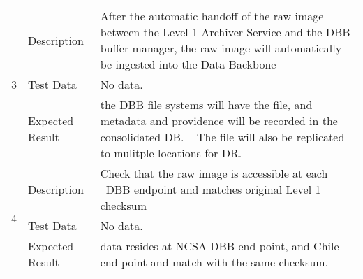 \begin{longtable}[]{p{1.3cm}p{2cm}p{13cm}}
            \multirow{3}{*}{ 3 } & Description &
            \begin{minipage}[t]{13cm}{\footnotesize
            After the automatic handoff of the raw image between the Level 1
Archiver Service and the DBB buffer manager, the raw image will
automatically be ingested into the Data Backbone

            \vspace{\dp0}
            } \end{minipage} \\ \cline{2-3}
            & Test Data &
            \begin{minipage}[t]{13cm}{\footnotesize
                No data.
                \vspace{\dp0}
            } \end{minipage} \\ \cline{2-3}
            & Expected Result &
                \begin{minipage}[t]{13cm}{\footnotesize
                the DBB file systems will have the file, and metadata and providence
will be recorded in the consolidated DB. ~ The file will also be
replicated to mulitple locations for DR.~~

                \vspace{\dp0}
                } \end{minipage}
        \\ \midrule

            \multirow{3}{*}{ 4 } & Description &
            \begin{minipage}[t]{13cm}{\footnotesize
            Check that the raw image is accessible at each ~DBB endpoint and matches
original Level 1 checksum

            \vspace{\dp0}
            } \end{minipage} \\ \cline{2-3}
            & Test Data &
            \begin{minipage}[t]{13cm}{\footnotesize
                No data.
                \vspace{\dp0}
            } \end{minipage} \\ \cline{2-3}
            & Expected Result &
                \begin{minipage}[t]{13cm}{\footnotesize
                data resides at NCSA DBB end point, and Chile end point and match with
the same checksum.~~

                \vspace{\dp0}
                } \end{minipage}
        \\ \midrule


\end{longtable}
